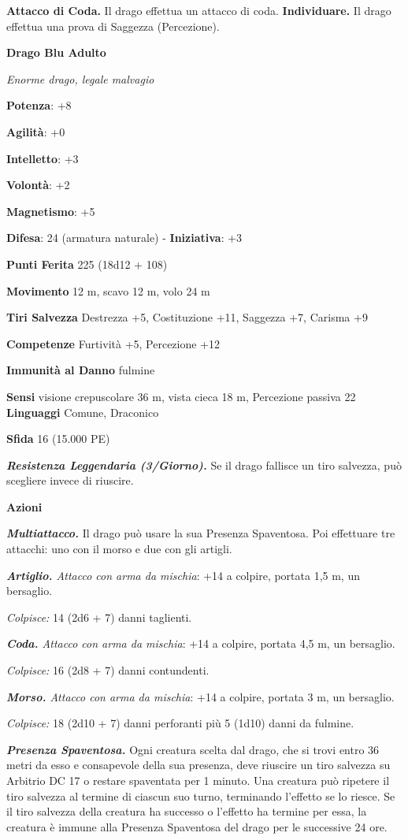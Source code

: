 \begin{multicols}{2}
\textbf{Attacco di Coda.} Il drago effettua un attacco di coda.
\textbf{Individuare.} Il drago effettua una prova di Saggezza
(Percezione).

\textbf{Drago Blu Adulto}

\emph{Enorme drago, legale malvagio}

\textbf{Potenza}: +8

\textbf{Agilità}: +0

\textbf{Intelletto}: +3

\textbf{Volontà}: +2

\textbf{Magnetismo}: +5

\textbf{Difesa}: 24 (armatura naturale) - \textbf{Iniziativa}: +3

\textbf{Punti Ferita} 225 (18d12 + 108)

\textbf{Movimento} 12 m, scavo 12 m, volo 24 m

\textbf{Tiri Salvezza} Destrezza +5, Costituzione +11, Saggezza +7,
Carisma +9

\textbf{Competenze} Furtività +5, Percezione +12

\textbf{Immunità al Danno} fulmine

\textbf{Sensi} visione crepuscolare 36 m, vista cieca 18 m, Percezione passiva
22 \textbf{Linguaggi} Comune, Draconico

\textbf{Sfida} 16 (15.000 PE)

\emph{\textbf{Resistenza Leggendaria (3/Giorno).}} Se il drago fallisce
un tiro salvezza, può scegliere invece di riuscire.

\textbf{Azioni}

\emph{\textbf{Multiattacco.}} Il drago può usare la sua Presenza
Spaventosa. Poi effettuare tre attacchi: uno con il morso e due con gli
artigli.

\emph{\textbf{Artiglio.} Attacco con arma da mischia}: +14 a colpire,
portata 1,5 m, un bersaglio.

\emph{Colpisce:} 14 (2d6 + 7) danni taglienti.

\emph{\textbf{Coda.} Attacco con arma da mischia}: +14 a colpire,
portata 4,5 m, un bersaglio.

\emph{Colpisce:} 16 (2d8 + 7) danni contundenti.

\emph{\textbf{Morso.} Attacco con arma da mischia}: +14 a colpire,
portata 3 m, un bersaglio.

\emph{Colpisce:} 18 (2d10 + 7) danni perforanti più 5 (1d10) danni da
fulmine.

\emph{\textbf{Presenza Spaventosa.}} Ogni creatura scelta dal drago, che
si trovi entro 36 metri da esso e consapevole della sua presenza, deve
riuscire un tiro salvezza su Arbitrio DC 17 o restare spaventata per 1
minuto. Una creatura può ripetere il tiro salvezza al termine di ciascun
suo turno, terminando l'effetto se lo riesce. Se il tiro salvezza della
creatura ha successo o l'effetto ha termine per essa, la creatura è
immune alla Presenza Spaventosa del drago per le successive 24 ore.


\end{multicols}
